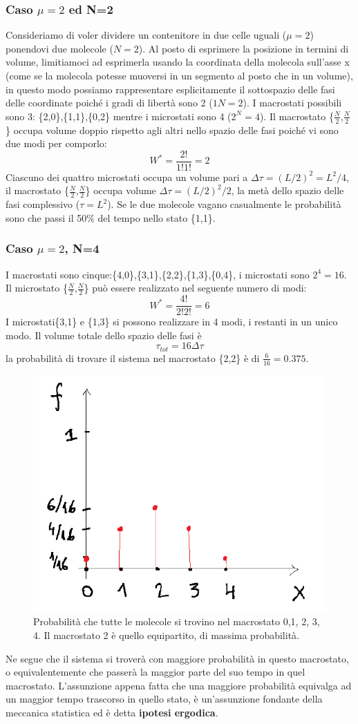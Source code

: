 \documentclass[
10pt, %
a4paper, %
oneside, %
headinclude,footinclude, %
BCOR5mm, %
]{scrartcl}
\begin{document}
\subsubsection*{Caso $\mu=2$ ed N=2}
Consideriamo di voler dividere un contenitore in due celle uguali ($\mu=2$) ponendovi due molecole (\(N=2\)). Al posto di esprimere la posizione in termini di volume, limitiamoci ad esprimerla usando la coordinata della molecola sull'asse x (come se la molecola potesse muoversi in un segmento al posto che in un volume), in questo modo possiamo rappresentare esplicitamente il sottospazio delle fasi delle coordinate poiché i gradi di libertà sono 2 (\(1N=2\)). I macrostati possibili sono 3: \{2,0\},\{1,1\},\{0,2\} mentre i microstati sono 4 (\(2^N = 4\)). Il macrostato \{$\frac{N}{2}$,$\frac{N}{2}$\} occupa volume doppio rispetto agli altri nello spazio delle fasi poiché vi sono due modi per comporlo:
\[W^*=\frac{2!}{1!1!}=2\]
Ciascuno dei quattro microstati occupa un volume pari a \(\Delta\tau = (L/2)^2=L^2/4 \), il macrostato  \{$\frac{N}{2}$,$\frac{N}{2}$\} occupa volume \(\Delta\tau = (L/2)^2/2 \), la metà dello spazio delle fasi complessivo (\(\tau = L^2\)). Se le due molecole vagano casualmente le probabilità sono che passi il 50\% del tempo nello stato \{1,1\}.
\subsubsection*{Caso $\mu=2$, N=4}
I macrostati sono cinque:\{4,0\},\{3,1\},\{2,2\},\{1,3\},\{0,4\}, i microstati sono \(2^4=16\). Il microstato \{$\frac{N}{2}$,$\frac{N}{2}$\} può essere realizzato nel seguente numero di modi:
\[W^* = \frac{4!}{2!2!} = 6\]
I microstati\{3,1\} e \{1,3\} si possono realizzare in 4 modi, i restanti in un unico modo. Il volume totale dello spazio delle fasi è 
\[\tau_{tot}=16\Delta\tau \]
la probabilità di trovare il sistema nel macrostato \{2,2\} è di \(\frac{6}{16}=0.375\).
\begin{figure}[h!]
	\centering
	\includegraphics[width=0.4\linewidth]{"../images/caso a 4"}
	\caption{Probabilità che tutte le molecole si trovino nel macrostato 0,1, 2, 3, 4. Il macrostato 2 è quello equipartito, di massima probabilità.}
	\label{fig:caso-a-4}
\end{figure}
\FloatBarrier
Ne segue che il sistema si troverà con maggiore probabilità in questo macrostato, o equivalentemente che passerà la maggior parte del suo tempo in quel macrostato. L'assunzione appena fatta che una maggiore probabilità equivalga ad un maggior tempo trascorso in quello stato, è un'assunzione fondante della meccanica statistica ed è detta \textbf{ipotesi ergodica}. 
\end{document}
